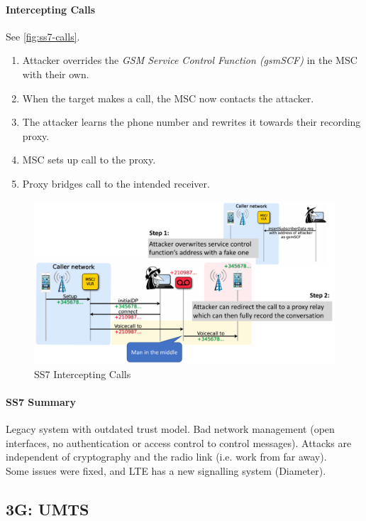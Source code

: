 \paragraph{Intercepting Calls}
See \autoref{fig:ss7-calls}.
\begin{enumerate}
	\item Attacker overrides the \textit{GSM Service Control Function (gsmSCF)} in the MSC with their own.
	\item When the target makes a call, the MSC now contacts the attacker.
	\item The attacker learns the phone number and rewrites it towards their recording proxy.
	\item MSC sets up call to the proxy.
	\item Proxy bridges call to the intended receiver.
\end{enumerate}

\begin{figure}
	\centering
	\includegraphics[scale=0.4]{images/10-ss7-calls.png}
	\caption{SS7 Intercepting Calls}
	\label{fig:ss7-calls}
\end{figure}

\paragraph{SS7 Summary}
Legacy system with outdated trust model.
Bad network management (open interfaces, no authentication or access control to control messages).
Attacks are independent of cryptography and the radio link (i.e. work from far away).
\\
Some issues were fixed, and LTE has a new signalling system (Diameter).


\subsection{3G: UMTS}

